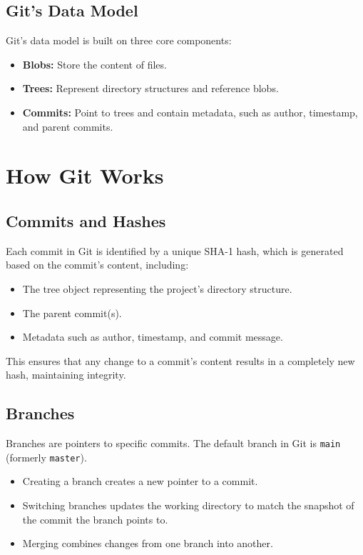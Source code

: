 \subsection{Git's Data Model}
Git's data model is built on three core components:
\begin{itemize}
    \item \textbf{Blobs:} Store the content of files.
    \item \textbf{Trees:} Represent directory structures and reference blobs.
    \item \textbf{Commits:} Point to trees and contain metadata, such as author, timestamp, and parent commits.
\end{itemize}

\section{How Git Works}

\subsection{Commits and Hashes}
Each commit in Git is identified by a unique SHA-1 hash, which is generated based on the commit's content, including:
\begin{itemize}
    \item The tree object representing the project's directory structure.
    \item The parent commit(s).
    \item Metadata such as author, timestamp, and commit message.
\end{itemize}
This ensures that any change to a commit's content results in a completely new hash, maintaining integrity.

\subsection{Branches}
Branches are pointers to specific commits. The default branch in Git is \texttt{main} (formerly \texttt{master}).
\begin{itemize}
    \item Creating a branch creates a new pointer to a commit.
    \item Switching branches updates the working directory to match the snapshot of the commit the branch points to.
    \item Merging combines changes from one branch into another.
\end{itemize}

